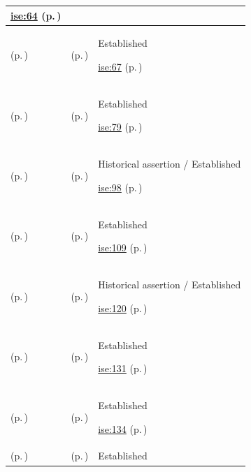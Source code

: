 \begin{longtable}{|>{\raggedright\arraybackslash}p{0.27\TableWidth}|>{\raggedright\arraybackslash}p{0.27\TableWidth}|>{\raggedright\arraybackslash}p{0.46\TableWidth}|}
 \hyperref[rad:ise:52]{ise:64} (p.\,\pageref{rad:ise:52})\\\hline
\nameref{service:clinical-event-syndication-stream} (p.\,\pageref{service:clinical-event-syndication-stream}) & \nameref{feature:feat-ise-07} (p.\,\pageref{feature:feat-ise-07}) & Established

 \hyperref[rad:ise:52]{ise:67} (p.\,\pageref{rad:ise:52})\\\hline
\nameref{service:clinical-information-search-service} (p.\,\pageref{service:clinical-information-search-service}) & \nameref{feature:feat-ise-08} (p.\,\pageref{feature:feat-ise-08}) & Established

 \hyperref[rad:ise:73]{ise:79} (p.\,\pageref{rad:ise:73})\\\hline
\nameref{service:standards-communication-gateway-service} (p.\,\pageref{service:standards-communication-gateway-service}) & \nameref{feature:feat-ise-10} (p.\,\pageref{feature:feat-ise-10}) & Historical assertion / Established

 \hyperref[rad:ise:92]{ise:98} (p.\,\pageref{rad:ise:92})\\\hline
\nameref{service:policy-evaluation-authorisation-service} (p.\,\pageref{service:policy-evaluation-authorisation-service}) & \nameref{feature:feat-ise-11} (p.\,\pageref{feature:feat-ise-11}) & Established

 \hyperref[rad:ise:104]{ise:109} (p.\,\pageref{rad:ise:104})\\\hline
\nameref{service:security-audit-ingress} (p.\,\pageref{service:security-audit-ingress}) & \nameref{feature:feat-ise-13} (p.\,\pageref{feature:feat-ise-13}) & Historical assertion / Established

 \hyperref[rad:ise:104]{ise:120} (p.\,\pageref{rad:ise:104})\\\hline
\nameref{service:terminology-concept-resolution-service} (p.\,\pageref{service:terminology-concept-resolution-service}) & \nameref{feature:feat-ise-14} (p.\,\pageref{feature:feat-ise-14}) & Established

 \hyperref[rad:ise:126]{ise:131} (p.\,\pageref{rad:ise:126})\\\hline
\nameref{service:terminology-mapping-service} (p.\,\pageref{service:terminology-mapping-service}) & \nameref{feature:feat-ise-15} (p.\,\pageref{feature:feat-ise-15}) & Established

 \hyperref[rad:ise:126]{ise:134} (p.\,\pageref{rad:ise:126})\\\hline
\nameref{service:clinical-collaboration-space-service} (p.\,\pageref{service:clinical-collaboration-space-service}) & \nameref{feature:feat-ise-16} (p.\,\pageref{feature:feat-ise-16}) & Established


\end{longtable}
